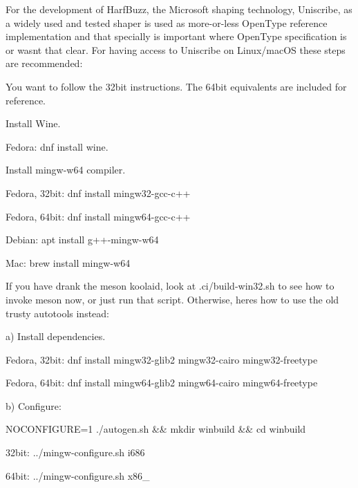 For the development of Harf\+Buzz, the Microsoft shaping technology, Uniscribe, as a widely used and tested shaper is used as more-\/or-\/less Open\+Type reference implementation and that specially is important where Open\+Type specification is or wasn\textquotesingle{}t that clear. For having access to Uniscribe on Linux/mac\+OS these steps are recommended\+:

You want to follow the 32bit instructions. The 64bit equivalents are included for reference.


\begin{DoxyEnumerate}
\item Install Wine.
\begin{DoxyItemize}
\item Fedora\+: {\ttfamily dnf install wine}.
\end{DoxyItemize}
\item Install {\ttfamily mingw-\/w64} compiler.
\begin{DoxyItemize}
\item Fedora, 32bit\+: {\ttfamily dnf install mingw32-\/gcc-\/c++}
\item Fedora, 64bit\+: {\ttfamily dnf install mingw64-\/gcc-\/c++}
\item Debian\+: {\ttfamily apt install g++-\/mingw-\/w64}
\item Mac\+: {\ttfamily brew install mingw-\/w64}
\end{DoxyItemize}
\item If you have drank the {\ttfamily meson} koolaid, look at {\ttfamily .ci/build-\/win32.\+sh} to see how to invoke {\ttfamily meson} now, or just run that script. Otherwise, here\textquotesingle{}s how to use the old trusty autotools instead\+:

a) Install dependencies.
\begin{DoxyItemize}
\item Fedora, 32bit\+: {\ttfamily dnf install mingw32-\/glib2 mingw32-\/cairo mingw32-\/freetype}
\item Fedora, 64bit\+: {\ttfamily dnf install mingw64-\/glib2 mingw64-\/cairo mingw64-\/freetype}
\end{DoxyItemize}

b) Configure\+:
\begin{DoxyItemize}
\item {\ttfamily NOCONFIGURE=1 ./autogen.sh \&\& mkdir winbuild \&\& cd winbuild}
\item 32bit\+: {\ttfamily ../mingw-\/configure.sh i686}
\item 64bit\+: {\ttfamily ../mingw-\/configure.sh x86\+\_}
\end{DoxyItemize}
\end{DoxyEnumerate}

